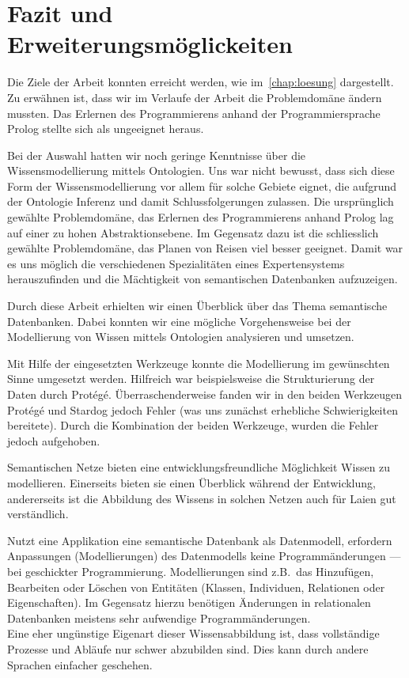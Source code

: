 \chapter{Fazit und Erweiterungsmöglickeiten}
\label{chap:fazit}


Die Ziele der Arbeit konnten erreicht werden, wie im~\autoref{chap:loesung} dargestellt. Zu erwähnen ist, dass wir im Verlaufe der Arbeit die Problemdomäne ändern mussten. Das Erlernen des Programmierens anhand der Programmiersprache Prolog stellte sich als ungeeignet heraus.

Bei der Auswahl hatten wir noch geringe Kenntnisse über die Wissensmodellierung mittels Ontologien. Uns war nicht bewusst, dass sich diese Form der Wissensmodellierung vor allem für solche Gebiete eignet, die aufgrund der Ontologie Inferenz und damit Schlussfolgerungen zulassen. Die ursprünglich gewählte Problemdomäne, das Erlernen des Programmierens anhand Prolog lag auf einer zu hohen Abstraktionsebene. Im Gegensatz dazu ist die schliesslich gewählte Problemdomäne, das Planen von Reisen viel besser geeignet. Damit war es uns möglich die verschiedenen Spezialitäten eines Expertensystems herauszufinden und die Mächtigkeit von semantischen Datenbanken aufzuzeigen.

Durch diese Arbeit erhielten wir einen Überblick über das Thema semantische Datenbanken. Dabei konnten wir eine mögliche Vorgehensweise bei der Modellierung von Wissen mittels Ontologien analysieren und umsetzen.

Mit Hilfe der eingesetzten Werkzeuge konnte die Modellierung im gewünschten Sinne umgesetzt werden. Hilfreich war beispielsweise die Strukturierung der Daten durch Protégé.
Überraschenderweise fanden wir in den beiden Werkzeugen Protégé und Stardog jedoch Fehler (was uns zunächst erhebliche Schwierigkeiten bereitete). Durch die Kombination der beiden Werkzeuge, wurden die Fehler jedoch aufgehoben.

Semantischen Netze bieten eine entwicklungsfreundliche Möglichkeit Wissen zu modellieren. Einerseits bieten sie einen Überblick während der Entwicklung, andererseits ist die Abbildung des Wissens in solchen Netzen auch für Laien gut verständlich.

Nutzt eine Applikation eine semantische Datenbank als Datenmodell, erfordern Anpassungen (Modellierungen) des Datenmodells keine Programmänderungen --- bei geschickter Programmierung. Modellierungen sind z.B.\ das Hinzufügen, Bearbeiten oder Löschen von Entitäten (Klassen, Individuen, Relationen oder Eigenschaften). Im Gegensatz hierzu benötigen Änderungen in relationalen Datenbanken meistens sehr aufwendige Programmänderungen.\\
Eine eher ungünstige Eigenart dieser Wissensabbildung ist, dass vollständige Prozesse und Abläufe nur schwer abzubilden sind. Dies kann durch andere Sprachen einfacher geschehen.


